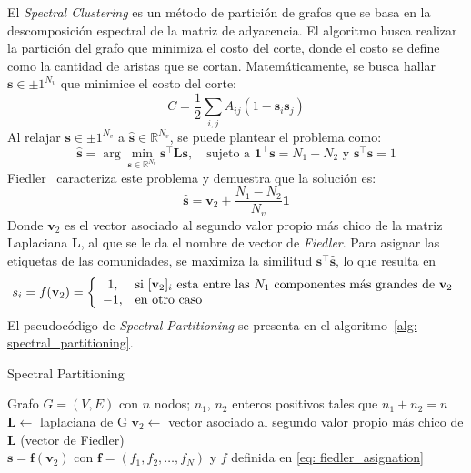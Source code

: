 \documentclass{article}
\begin{document}
El \emph{Spectral Clustering} es un método de partición de grafos que se basa en la descomposición espectral de la matriz de adyacencia. El algoritmo busca realizar la partición del grafo que minimiza el costo del corte, donde el costo se define como la cantidad de aristas que se cortan. Matemáticamente, se busca hallar $\mathbf{s}\in{\pm 1}^{N_v}$ que minimice el costo del corte:
\begin{equation*}
    C = \frac{1}{2} \sum_{i,j} A_{ij} (1 - \mathbf{s}_i \mathbf{s}_j)
\end{equation*}
Al relajar $\mathbf{s}\in{\pm 1}^{N_v}$ a $\mathbf{\hat{s}}\in{\mathbb{R}}^{N_v}$, se puede plantear el problema como:
\begin{equation*}
    \mathbf{\hat{s}} = \arg \min_{\mathbf{s}\in{\mathbb{R}}^{N_v}} \mathbf{s}^\top \mathbf{L} \mathbf{s}, \quad \text{sujeto a } \mathbf{1}^\top \mathbf{s} = N_1 - N_2 \text{ y } \mathbf{s}^\top \mathbf{s} = 1
\end{equation*}
Fiedler~\cite{Fiedler1973} caracteriza este problema y demuestra que la solución es:
\begin{equation*}
    \mathbf{\hat{s}} = \mathbf{v}_2 + \frac{N_1 - N_2}{N_v} \mathbf{1}
\end{equation*}
Donde $\mathbf{v}_2$ es el vector asociado al segundo valor propio más chico de la matriz Laplaciana $\mathbf{L}$, al que se le da el nombre de vector de \emph{Fiedler}. Para asignar las
etiquetas de las comunidades, se maximiza la similitud $\mathbf{s}^\top\mathbf{\hat{s}}$, lo que resulta en
\begin{equation}
    \label{eq: fiedler_asignation}
    s_i = f(\mathbf{v}_2) = \left\lbrace
    \begin{array}{c l}
        1,  & \text{si } [\mathbf{v}_2]_i \text{ esta entre las $N_1$ componentes más grandes de $\mathbf{v}_2$} \\
        -1, & \text{en otro caso}
    \end{array}\right.
\end{equation}
El pseudocódigo de \emph{Spectral Partitioning} se presenta en el algoritmo~\ref{alg: spectral_partitioning}.
\begin{algorithm}
    \caption{Spectral Partitioning}
    \label{alg: spectral_partitioning}
    \begin{algorithmic}
        \Require Grafo $G = (V, E)$ con $n$ nodos; $n_1$, $n_2$ enteros positivos tales que $n_1 + n_2 = n$
        \State  $\mathbf{L} \leftarrow $ laplaciana de G
        \State $\mathbf{v}_2 \leftarrow $ vector asociado al segundo valor propio más chico de $\mathbf{L}$ (vector de Fiedler)\\
        \Return $\mathbf{s} = \mathbf{f}(\mathbf{v}_2)$ con $\mathbf{f}=(f_1,f_2,\ldots,f_N)$ y $f$ definida en \eqref{eq: fiedler_asignation}
    \end{algorithmic}
\end{algorithm}
\end{document}

